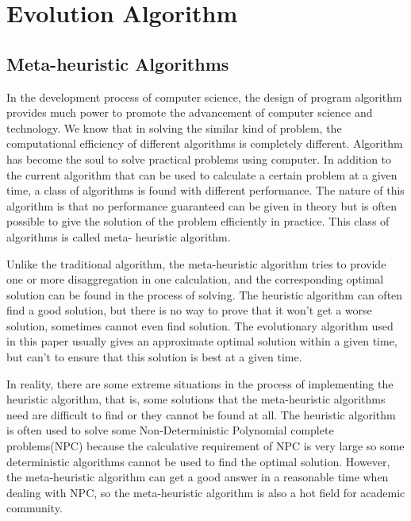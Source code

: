
\section{Evolution Algorithm}

\subsection{Meta-heuristic Algorithms}
%
In the development process of computer science, the design of program 
algorithm provides much power to promote the advancement of computer science 
and technology. We know that in solving the similar kind of problem, the 
computational efficiency of different algorithms is completely different. 
Algorithm has become the soul to solve practical problems using computer. In 
addition to the current algorithm that can be used to calculate a certain 
problem at a given time, a class of algorithms is found with different 
performance. The nature of this algorithm is that no performance guaranteed 
can be given in theory but is often possible to give the solution of the 
problem efficiently in practice. This class of algorithms is called meta-
heuristic algorithm.

Unlike the traditional algorithm, the meta-heuristic algorithm tries to 
provide one or more disaggregation in one calculation, and the corresponding 
optimal solution can be found in the process of solving. The heuristic 
algorithm can often find a good solution, but there is no way to prove that 
it won’t get a worse solution, sometimes cannot even find solution. The 
evolutionary algorithm used in this paper usually gives an approximate 
optimal solution within a given time, but can’t to ensure that this solution 
is best at a given time.

In reality, there are some extreme situations in the process of implementing 
the heuristic algorithm, that is, some solutions that the meta-heuristic 
algorithms need are difficult to find or they cannot be found at all. The 
heuristic algorithm is often used to solve some Non-Deterministic Polynomial 
complete problems(NPC) because the calculative requirement of NPC is very 
large so some deterministic algorithms cannot be used to find the optimal 
solution. However, the meta-heuristic algorithm can get a good answer in a 
reasonable time when dealing with NPC, so the meta-heuristic algorithm is 
also a hot field for academic community.

